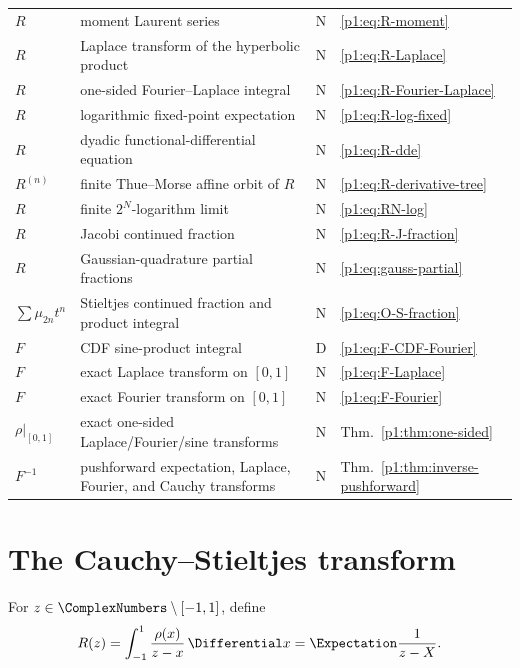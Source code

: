 \documentclass[11pt]{article}
\theoremstyle{definition}
\theoremstyle{remark}
\newcommand{\statusderived}{\textsf{D}}
\newcommand{\statusnew}{\textsf{N}}
\begin{document}
\begin{longtable}{@{}p{}p{}p{}p{}@{}}
\(R\) & moment Laurent series & \statusnew & \eqref{p1:eq:R-moment} \\
\(R\) & Laplace transform of the hyperbolic product & \statusnew & \eqref{p1:eq:R-Laplace} \\
\(R\) & one-sided Fourier--Laplace integral & \statusnew & \eqref{p1:eq:R-Fourier-Laplace} \\
\(R\) & logarithmic fixed-point expectation & \statusnew & \eqref{p1:eq:R-log-fixed} \\
\(R\) & dyadic functional-differential equation & \statusnew & \eqref{p1:eq:R-dde} \\
\(R^{(n)}\) & finite Thue--Morse affine orbit of \(R\) & \statusnew & \eqref{p1:eq:R-derivative-tree} \\
\(R\) & finite \(2^N\)-logarithm limit & \statusnew & \eqref{p1:eq:RN-log} \\
\(R\) & Jacobi continued fraction & \statusnew & \eqref{p1:eq:R-J-fraction} \\
\(R\) & Gaussian-quadrature partial fractions & \statusnew & \eqref{p1:eq:gauss-partial} \\
\(\sum\mu_{2n}t^n\) & Stieltjes continued fraction and product integral & \statusnew & \eqref{p1:eq:O-S-fraction} \\
\(F\) & CDF sine-product integral & \statusderived & \eqref{p1:eq:F-CDF-Fourier} \\
\(F\) & exact Laplace transform on \([0,1]\) & \statusnew & \eqref{p1:eq:F-Laplace} \\
\(F\) & exact Fourier transform on \([0,1]\) & \statusnew & \eqref{p1:eq:F-Fourier} \\
\(\rho|_{[0,1]}\) & exact one-sided Laplace/Fourier/sine transforms & \statusnew & Thm.~\ref{p1:thm:one-sided} \\
\(F^{-1}\) & pushforward expectation, Laplace, Fourier, and Cauchy transforms & \statusnew & Thm.~\ref{p1:thm:inverse-pushforward} \\
\bottomrule
\end{longtable}
\normalsize

\section{The Cauchy--Stieltjes transform}\label{p1:sec:cauchy}

\begin{definition}
For \(z\in\ComplexNumbers\setminus[-1,1]\), define
\begin{equation}
 R(z)=\int_{-1}^{1}\frac{\rho(x)}{z-x}\,\Differential x=\Expectation\frac1{z-X}. \label{p1:eq:R-def}
\end{equation}
\end{definition}
\end{document}
